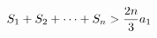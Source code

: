 \documentclass[preview]{standalone}
\begin{document}
\begin{align*}
\special{dvisvgm:raw <g id='unique000'>}S_1+S_2+\cdots+S_n>\frac{2n}{3}a_1\special{dvisvgm:raw </g>}
\end{align*}
\end{document}
